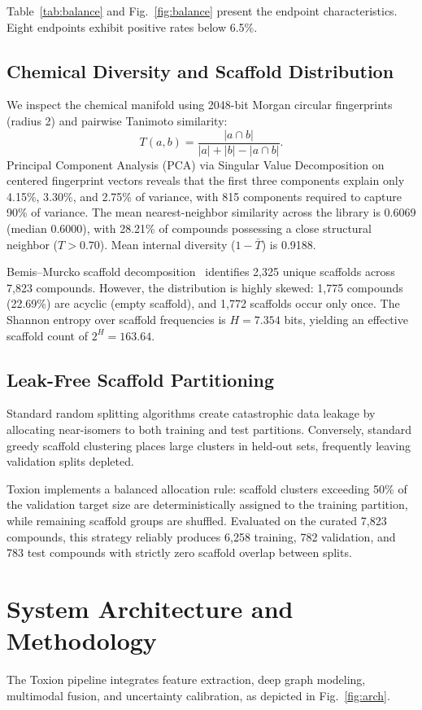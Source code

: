 \documentclass[conference]{IEEEtran}
\begin{document}
Table~\ref{tab:balance} and Fig.~\ref{fig:balance} present the endpoint characteristics. Eight endpoints exhibit positive rates below 6.5\%.

\subsection{Chemical Diversity and Scaffold Distribution}
We inspect the chemical manifold using 2048-bit Morgan circular fingerprints (radius 2) and pairwise Tanimoto similarity:
\begin{equation}
T(a,b) = \frac{|a \cap b|}{|a| + |b| - |a \cap b|}.
\end{equation}
Principal Component Analysis (PCA) via Singular Value Decomposition on centered fingerprint vectors reveals that the first three components explain only 4.15\%, 3.30\%, and 2.75\% of variance, with 815 components required to capture 90\% of variance. The mean nearest-neighbor similarity across the library is 0.6069 (median 0.6000), with 28.21\% of compounds possessing a close structural neighbor ($T > 0.70$). Mean internal diversity ($1 - \bar{T}$) is 0.9188.

Bemis--Murcko scaffold decomposition~\cite{bemis1996murcko} identifies 2{,}325 unique scaffolds across 7{,}823 compounds. However, the distribution is highly skewed: 1{,}775 compounds (22.69\%) are acyclic (empty scaffold), and 1{,}772 scaffolds occur only once. The Shannon entropy over scaffold frequencies is $H = 7.354$ bits, yielding an effective scaffold count of $2^H = 163.64$.

\subsection{Leak-Free Scaffold Partitioning}
Standard random splitting algorithms create catastrophic data leakage by allocating near-isomers to both training and test partitions. Conversely, standard greedy scaffold clustering places large clusters in held-out sets, frequently leaving validation splits depleted.

Toxion implements a balanced allocation rule: scaffold clusters exceeding 50\% of the validation target size are deterministically assigned to the training partition, while remaining scaffold groups are shuffled. Evaluated on the curated 7{,}823 compounds, this strategy reliably produces 6{,}258 training, 782 validation, and 783 test compounds with strictly zero scaffold overlap between splits.

\section{System Architecture and Methodology}
The Toxion pipeline integrates feature extraction, deep graph modeling, multimodal fusion, and uncertainty calibration, as depicted in Fig.~\ref{fig:arch}.
\end{document}
